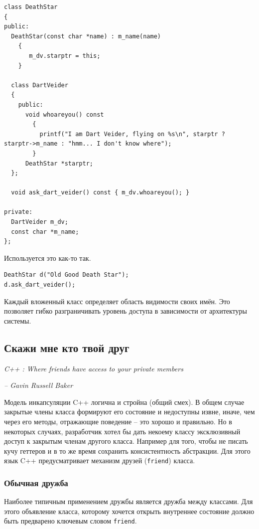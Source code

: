 \documentclass[a4paper,12pt,oneside]{article}
\begin{document}
\begin{lstlisting}
class DeathStar
{
public:
  DeathStar(const char *name) : m_name(name)
    {
       m_dv.starptr = this;
    }

  class DartVeider
  {
    public:
      void whoareyou() const
        {
          printf("I am Dart Veider, flying on %s\n", starptr ? starptr->m_name : "hmm... I don't know where");
        }
      DeathStar *starptr;    
  };

  void ask_dart_veider() const { m_dv.whoareyou(); }

private:
  DartVeider m_dv;
  const char *m_name;
};
\end{lstlisting}

Используется это как-то так.

\begin{lstlisting}
DeathStar d("Old Good Death Star");
d.ask_dart_veider();
\end{lstlisting}

Каждый вложенный класс определяет область видимости своих имён. Это позволяет гибко разграничивать уровень доступа в зависимости от архитектуры системы.

\pagebreak
\subsection{Скажи мне кто твой друг}\label{WhosYourFriend}

\hfill\textit{C++ : Where friends have access to your private members}{\vspace{0.5em}}

\hfill\textit{-- Gavin Russell Baker}

Модель инкапсуляции C++ логична и стройна (общий смех). В общем случае закрытые члены класса формируют его состояние и недоступны извне, иначе, чем через его методы, отражающие поведение -- это хорошо и правильно. Но в некоторых случаях, разработчик хотел бы дать некоему классу эксклюзивный доступ к закрытым членам другого класса. Например для того, чтобы не писать кучу геттеров и в то же время сохранить консистентность абстракции. Для этого язык C++ предусматривает механизм друзей (\lstinline!friend!) класса.

\subsubsection{Обычная дружба}

Наиболее типичным применением дружбы является дружба между классами. Для этого объявление класса, которому хочется открыть внутреннее состояние должно быть предварено ключевым словом \lstinline!friend!.
\end{document}
